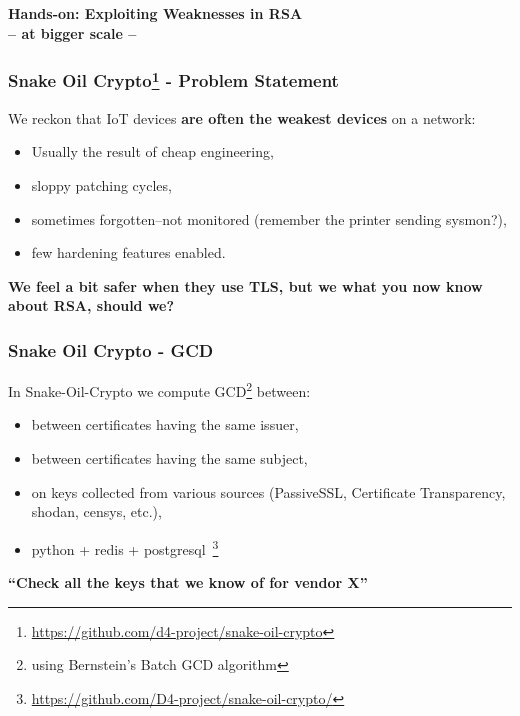 \begin{frame}
  \begin{center}
    {\bf Hands-on: Exploiting Weaknesses in RSA}\\
    {\bf -- at bigger scale --}\\
  \end{center}
\end{frame}

\begin{frame}
  \frametitle{Snake Oil Crypto\footnote{\url{https://github.com/d4-project/snake-oil-crypto}} - Problem Statement}
  We reckon that IoT devices {\bf are often the weakest devices} on a network:

        \begin{itemize}
        \item Usually the result of cheap engineering,
        \item sloppy patching cycles,
        \item sometimes forgotten--not monitored (remember the printer sending sysmon?),
        \item few hardening features enabled.
        \end{itemize}

        \vspace{10 mm} 

{\bf We feel a bit safer when they use TLS, but we what you now know about RSA, should we?}
\end{frame}

\begin{frame}
   \frametitle{Snake Oil Crypto - GCD}
   In Snake-Oil-Crypto we compute GCD\footnote{using Bernstein's Batch GCD algorithm} between:
   
   \begin{itemize}
     \item between certificates having the same issuer,
     \item between certificates having the same subject,
     \item on keys collected from various sources (PassiveSSL, Certificate Transparency,
       shodan, censys, etc.),
     \item python + redis + postgresql~\footnote{\url{https://github.com/D4-project/snake-oil-crypto/}}
   \end{itemize}

\vspace{10 mm}
  {\bf ``Check all the keys that we know of for vendor X''}

\end{frame}

